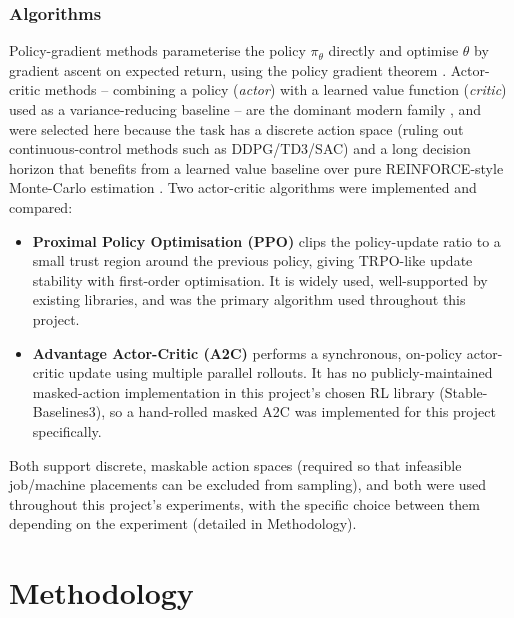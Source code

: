 \documentclass[12pt]{article}
\begin{document}
\subsubsection{Algorithms}
Policy-gradient methods parameterise the policy $\pi_\theta$ directly and optimise $\theta$ by gradient ascent on expected return, using the policy gradient theorem \cite{sutton2000policy}. Actor-critic methods -- combining a policy (\emph{actor}) with a learned value function (\emph{critic}) used as a variance-reducing baseline -- are the dominant modern family \cite{konda1999actorcritic}, and were selected here because the task has a discrete action space (ruling out continuous-control methods such as DDPG/TD3/SAC) and a long decision horizon that benefits from a learned value baseline over pure REINFORCE-style Monte-Carlo estimation \cite{williams1992reinforce}. Two actor-critic algorithms were implemented and compared:
\begin{itemize}
    \item \textbf{Proximal Policy Optimisation (PPO)} \cite{lehmann2024policygradients} clips the policy-update ratio to a small trust region around the previous policy, giving TRPO-like update stability with first-order optimisation. It is widely used, well-supported by existing libraries, and was the primary algorithm used throughout this project.
    \item \textbf{Advantage Actor-Critic (A2C)} \cite{aigreeksActorCritic, apxml_a2c_a3c_2026} performs a synchronous, on-policy actor-critic update using multiple parallel rollouts. It has no publicly-maintained masked-action implementation in this project's chosen RL library (Stable-Baselines3), so a hand-rolled masked A2C was implemented for this project specifically.
\end{itemize}
Both support discrete, maskable action spaces (required so that infeasible job/machine placements can be excluded from sampling), and both were used throughout this project's experiments, with the specific choice between them depending on the experiment (detailed in Methodology).

\section{Methodology}
\end{document}
